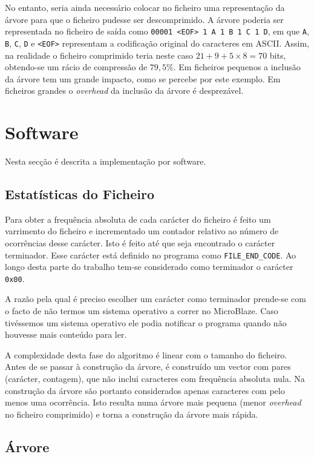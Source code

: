 \documentclass[a4paper]{article}
\begin{document}
	No entanto, seria ainda necessário colocar no ficheiro uma representação da árvore para que o ficheiro pudesse ser descomprimido. A árvore poderia ser representada no ficheiro de saída como \texttt{00001 <EOF> 1 A 1 B 1 C 1 D}, em que \texttt{A}, \texttt{B}, \texttt{C}, \texttt{D} e \texttt{<EOF>} representam a codificação original do caracteres em ASCII. Assim, na realidade o ficheiro comprimido teria neste caso $21 + 9 + 5 \times 8 = 70$ bits, obtendo-se um rácio de compressão de $79,5\%$. Em ficheiros pequenos a inclusão da árvore tem um grande impacto, como se percebe por este exemplo. Em ficheiros grandes o \textit{overhead} da inclusão da árvore é desprezável.

	\section{Software}

	Nesta secção é descrita a implementação por software.

	\subsection{Estatísticas do Ficheiro}

	Para obter a frequência absoluta de cada carácter do ficheiro é feito um varrimento do ficheiro e incrementado um contador relativo ao número de ocorrências desse carácter. Isto é feito até que seja encontrado o carácter terminador. Esse carácter está definido no programa como \texttt{FILE\_END\_CODE}. Ao longo desta parte do trabalho tem-se considerado como terminador o carácter \texttt{0x00}.

	A razão pela qual é preciso escolher um carácter como terminador prende-se com o facto de não termos um sistema operativo a correr no MicroBlaze. Caso tivéssemos um sistema operativo ele podia notificar o programa quando não houvesse mais conteúdo para ler.

	A complexidade desta fase do algoritmo é linear com o tamanho do ficheiro. Antes de se passar à construção da árvore, é construído um vector com pares (carácter, contagem), que não inclui caracteres com frequência absoluta nula. Na construção da árvore são portanto considerados apenas caracteres com pelo menos uma ocorrência. Isto resulta numa árvore mais pequena (menor \textit{overhead} no ficheiro comprimido) e torna a construção da árvore mais rápida.

	\subsection{Árvore}
\end{document}
